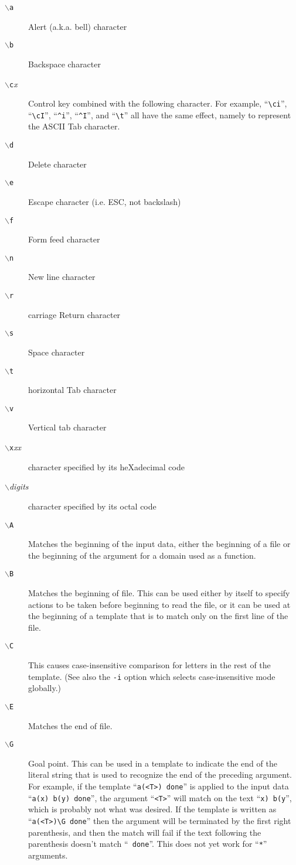 \begin{description}
\item[{\tt $\backslash$a}]
Alert (a.k.a. bell) character
\item[{\tt $\backslash$b}]
Backspace character
\item[{\tt $\backslash$c}{\it x}]
Control key combined with the following character.
For example, ``\verb/\ci/'', ``\verb/\cI/'', ``\verb/^i/'', ``\verb/^I/'',
and ``\verb/\t/'' all have the same effect, namely to represent the
ASCII Tab character.
\item[{\tt $\backslash$d}]
Delete character
\item[{\tt $\backslash$e}]
Escape character (i.e. ESC, not backslash)
\item[{\tt $\backslash$f}]
Form feed character
\item[{\tt $\backslash$n}]
New line character
\item[{\tt $\backslash$r}]
carriage Return character
\item[{\tt $\backslash$s}]
Space character
\item[{\tt $\backslash$t}]
horizontal Tab character
\item[{\tt $\backslash$v}]
Vertical tab character
\item[{\tt $\backslash$x}{\it xx}]
character specified by its heXadecimal code
\item[{\tt $\backslash$}{\it digits}]
character specified by its octal code

\item[{\tt $\backslash$A}]
Matches the beginning of the input data, either the beginning of a file
or the beginning of the argument for a domain used as a function.
\item[{\tt $\backslash$B}]
Matches the beginning of file.
This can be used either by itself to specify actions to be taken before
beginning to read the file, or it can be used at the beginning of a
template that is to match only on the first line of the file.
\item[{\tt $\backslash$C}]
This causes case-insensitive comparison for letters in the rest of the
template.  (See also the \verb/-i/ option which selects case-insensitive
mode globally.)
\item[{\tt $\backslash$E}]
Matches the  end of file.
\item[{\tt $\backslash$G}]
Goal point.
This can be used in a template to indicate the end of the literal string
that is used to recognize the end of the preceding argument.
For example, if the template ``\verb/a(<T>) done/'' is applied to the input
data ``\verb/a(x) b(y) done/'', the argument ``\verb/<T>/'' will match on
the text ``\verb/x) b(y/'', which is probably not what was desired.
If the template is written as ``\verb/a(<T>)\G done/'' then the argument
will be terminated by the first right parenthesis, and then the match will
fail if the text following the parenthesis doesn't match ``\verb/ done/''.
This does not yet work for ``\verb/*/'' arguments.


\end{description}
